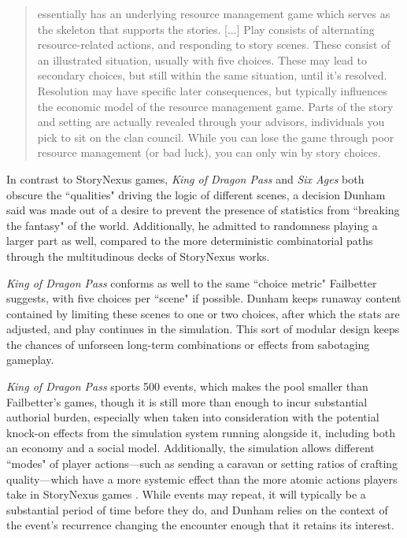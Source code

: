 \begin{quote}
essentially has an underlying resource management game which serves as the skeleton that supports the stories. [...] Play consists of alternating resource-related actions, and responding to story scenes. These consist of an illustrated situation, usually with five choices. These may lead to secondary choices, but still within the same situation, until it’s resolved. Resolution may have specific later consequences, but typically influences the economic model of the resource management game. Parts of the story and setting are actually revealed through your advisors, individuals you pick to sit on the clan council. While you can lose the game through poor resource management (or bad luck), you can only win by story choices.    
\end{quote}

In contrast to StoryNexus games, \textit{King of Dragon Pass} and \textit{Six Ages} both obscure the ``qualities" driving the logic of different scenes, a decision Dunham said was made out of a desire to prevent the presence of statistics from ``breaking the fantasy" of the world. Additionally, he admitted to randomness playing a larger part as well, compared to the more deterministic combinatorial paths through the multitudinous decks of StoryNexus works.

\textit{King of Dragon Pass} conforms as well to the same ``choice metric" Failbetter suggests, with five choices per ``scene" if possible. Dunham keeps runaway content contained by limiting these scenes to one or two choices, after which the stats are adjusted, and play continues in the simulation. This sort of modular design keeps the chances of unforseen long-term combinations or effects from sabotaging gameplay. 

\textit{King of Dragon Pass} sports 500 events, which makes the pool smaller than Failbetter's games, though it is still more than enough to incur substantial authorial burden, especially when taken into consideration with the potential knock-on effects from the simulation system running alongside it, including both an economy and a social model. Additionally, the simulation allows different ``modes" of player actions---such as sending a caravan or setting ratios of crafting quality---which have a more systemic effect than the more atomic actions players take in StoryNexus games \cite{dunham_repeatability}. While events may repeat, it will typically be a substantial period of time before they do, and Dunham relies on the context of the event's recurrence changing the encounter enough that it retains its interest.


